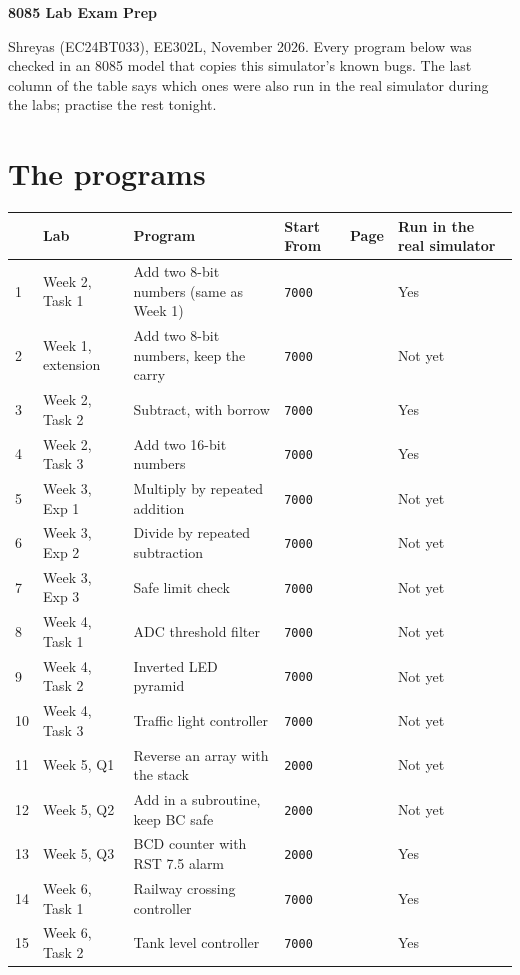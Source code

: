 \documentclass[11pt,a4paper]{article}
\newcommand{\code}[1]{\texttt{#1}}
\begin{document}
{\LARGE\sffamily\bfseries\color{accent} 8085 Lab Exam Prep\par}
\vspace{2pt}
{\small Shreyas (EC24BT033), EE302L, November 2026. Every program below was checked in an 8085 model that copies this simulator's known bugs. The last column of the table says which ones were also run in the real simulator during the labs; practise the rest tonight.\par}
\vspace{4pt}

\section*{The programs}
\small
\begin{tabularx}{\textwidth}{@{}l l L l r l@{}}
\toprule
& Lab & Program & Start From & Page & Run in the real simulator\\
 & Week 2, Task 1 & Add two 8-bit numbers (same as Week 1) & \code{7000} & \pageref{p1} & Yes\\
2 & Week 1, extension & Add two 8-bit numbers, keep the carry & \code{7000} & \pageref{p2} & Not yet\\
3 & Week 2, Task 2 & Subtract, with borrow & \code{7000} & \pageref{p3} & Yes\\
4 & Week 2, Task 3 & Add two 16-bit numbers & \code{7000} & \pageref{p4} & Yes\\
5 & Week 3, Exp 1 & Multiply by repeated addition & \code{7000} & \pageref{p5} & Not yet\\
6 & Week 3, Exp 2 & Divide by repeated subtraction & \code{7000} & \pageref{p6} & Not yet\\
7 & Week 3, Exp 3 & Safe limit check & \code{7000} & \pageref{p7} & Not yet\\
8 & Week 4, Task 1 & ADC threshold filter & \code{7000} & \pageref{p8} & Not yet\\
9 & Week 4, Task 2 & Inverted LED pyramid & \code{7000} & \pageref{p9} & Not yet\\
10 & Week 4, Task 3 & Traffic light controller & \code{7000} & \pageref{p10} & Not yet\\
11 & Week 5, Q1 & Reverse an array with the stack & \code{2000} & \pageref{p11} & Not yet\\
12 & Week 5, Q2 & Add in a subroutine, keep BC safe & \code{2000} & \pageref{p12} & Not yet\\
13 & Week 5, Q3 & BCD counter with RST 7.5 alarm & \code{2000} & \pageref{p13} & Yes\\
14 & Week 6, Task 1 & Railway crossing controller & \code{7000} & \pageref{p14} & Yes\\
15 & Week 6, Task 2 & Tank level controller & \code{7000} & \pageref{p15} & Yes\\
\bottomrule
\end{tabularx}
\normalsize
\end{document}

